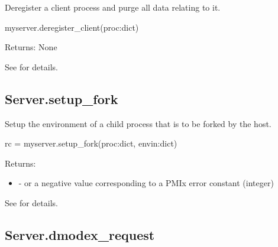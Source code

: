 \summary
Deregister a client process and purge all data relating to it.


\format

\pyspecificstart
\begin{codepar}
myserver.deregister_client(proc:dict)
\end{codepar}
\pyspecificend


\begin{arglist}
\end{arglist}

Returns: None

See  for details.


\subsection{Server.setup_fork}

\summary
Setup the environment of a child process that is to be forked
by the host.

\format

\pyspecificstart
\begin{codepar}
rc = myserver.setup_fork(proc:dict, envin:dict)
\end{codepar}
\pyspecificend


\begin{arglist}
\end{arglist}

Returns:

\begin{itemize}
    \item {} -  or a negative value corresponding to a PMIx error constant (integer)
\end{itemize}

See  for details.


\subsection{Server.dmodex_request}

